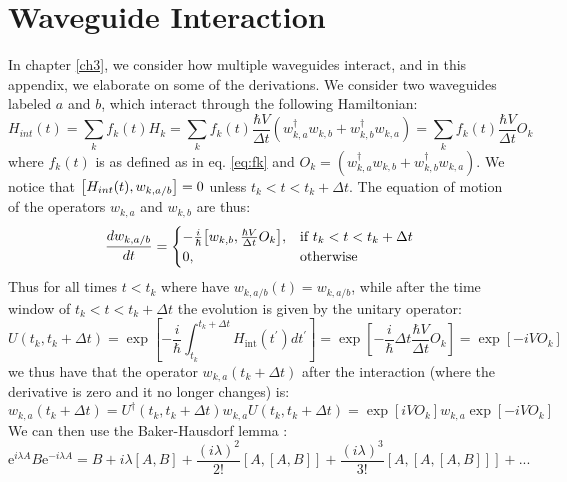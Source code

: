 \section{Waveguide Interaction \label{app:waveguideinteraction}}
In chapter \ref{ch3}, we consider how multiple waveguides interact, and in this appendix, we elaborate on some of the derivations. We consider two waveguides labeled $a$ and $b$, which interact through the following Hamiltonian:
\begin{equation}
     H_{int}(t) = \sum_k f_k(t) H_k = \sum_k f_k(t) \frac{\hbar V}{\Delta t}\left(w_{k, a}^{\dagger} w_{k, b}+w_{k, b}^{\dagger} w_{k, a}\right)= \sum_k f_k(t)\frac{\hbar V}{\Delta t} O_k
\end{equation}
where $f_k(t)$ is as defined as in eq. \eqref{eq:fk} and $O_k = \left(w_{k, a}^{\dagger} w_{k, b}+w_{k, b}^{\dagger} w_{k, a}\right)$. We notice that $\comm{H_{int}(t)}{w_{k,a/b}} = 0$ unless $t_k<t <t_k +\Delta t$. The equation of motion of the operators $w_{k,a}$ and $w_{k,b}$ are thus:
\begin{equation}
    \frac{d w_{k,a/b}}{d t} = \begin{cases}
           - \frac{i}{\hbar}\comm{w_{k,b}}{\frac{\hbar V}{\Delta t} O_k} , & \text{if } t_k < t <t_k+\Delta t  \\
          0, & \text{otherwise}
\end{cases}
\end{equation}
Thus for all times $t<t_k$ where have $w_{k,a/b}(t) = w_{k,a/b}$, while after the time window of $t_k < t <t_k+\Delta t$ the evolution is given by the unitary operator:
\begin{equation}
    U(t_k,t_k+\Delta t) =\exp \left[-\frac{i}{\hbar} \int_{t_k}^{t_k+\Delta t} H_{\mathrm{int}}(t^\prime) d t^{\prime}\right] = \exp \left[-\frac{i}{\hbar} 
\Delta t \frac{\hbar V}{\Delta t} O_k \right] = \exp \left[-i V O_k \right] 
\end{equation}
we thus have that the operator $w_{k,a}(t_k + \Delta t)$ after the interaction (where the derivative is zero and it no longer changes) is:
\begin{equation}
    w_{k,a}(t_k + \Delta t) = U^\dagger(t_k,t_k+\Delta t) w_{k,a} U(t_k,t_k+\Delta t)  = \exp \left[i V O_k \right]  w_{k,a} \exp \left[-i V O_k \right] 
\end{equation}
We can then use the Baker-Hausdorf lemma \cite{Gerry2004IntroductoryOptics}: 
\begin{equation}
   \mathrm{e}^{i \lambda A} B \mathrm{e}^{-i \lambda A} = B + i \lambda [A,B] + \frac{(i \lambda)^2}{2!}[A,[A,B]] + \frac{(i \lambda)^3}{3!}[A,[A,[A,B]]] + ...
\end{equation}
